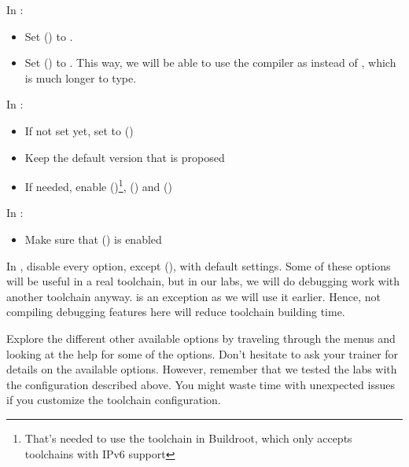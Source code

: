 
In :
\begin{itemize}
\item Set  () to .
\item Set  () to .
      This way, we will be able to use the compiler as 
      instead of , which is
      much longer to type.
\end{itemize}

In :
\begin{itemize}
  \item If not set yet, set  to 
        ()
  \item Keep the default version that is proposed
  \item If needed, enable 
        ()\footnote{
        That's needed to use the toolchain in Buildroot, which only
        accepts toolchains with IPv6 support},
         () and
        ()
\end{itemize}

In :
\begin{itemize}
  \item Make sure that  () is enabled
\end{itemize}

In , disable every option, except 
(), with default settings.
Some of these options will be useful in a real
toolchain, but in our labs, we will do debugging work with another
toolchain anyway.  is an exception as we will use it earlier.
Hence, not compiling debugging features here will reduce toolchain building time.

Explore the different other available options by traveling through the
menus and looking at the help for some of the options. Don't hesitate
to ask your trainer for details on the available options. However,
remember that we tested the labs with the configuration described
above. You might waste time with unexpected issues if you customize the
toolchain configuration.

